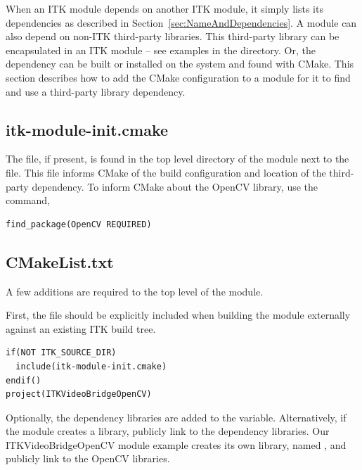 When an ITK module depends on another ITK module, it simply lists its
dependencies as described in Section~\ref{sec:NameAndDependencies}. A module
can also depend on non-ITK third-party libraries. This third-party library can
be encapsulated in an ITK module -- see examples in the
 directory. Or, the dependency can be built or
installed on the system and found with CMake. This section describes how to
add the CMake configuration to a module for it to find and use a third-party
library dependency.


\subsection{itk-module-init.cmake}

The  file, if present, is found in the top level
directory of the module next to the  file. This file
informs CMake of the build configuration and location of the third-party
dependency. To inform CMake about the OpenCV library, use the
 command,

\begin{verbatim}
find_package(OpenCV REQUIRED)
\end{verbatim}


\subsection{CMakeList.txt}

A few additions are required to the top level  of the
module.

First, the  file should be explicitly included
when building the module externally against an existing ITK build tree.

\begin{verbatim}
if(NOT ITK_SOURCE_DIR)
  include(itk-module-init.cmake)
endif()
project(ITKVideoBridgeOpenCV)
\end{verbatim}

Optionally, the dependency libraries are added to the
 variable. Alternatively, if the module creates
a library, publicly link to the dependency libraries. Our
ITKVideoBridgeOpenCV module example creates its own library, named
, and publicly link to the OpenCV libraries.

